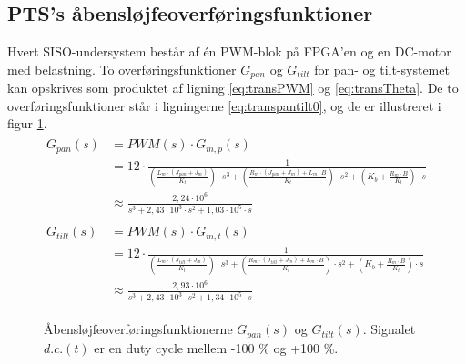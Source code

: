 \subsection{PTS's åbensløjfeoverføringsfunktioner}
Hvert SISO-undersystem består af én PWM-blok på FPGA'en og en DC-motor med belastning.
To overføringsfunktioner \(G_{pan}\) og \(G_{tilt}\) for pan- og tilt-systemet kan opskrives
som produktet af ligning \ref{eq:transPWM} og \ref{eq:transTheta}. De to overføringsfunktioner
står i ligningerne \ref{eq:transpantilt0}, og de er illustreret i figur \ref{fig:openloop1}.
\begin{align}
\label{eq:transpantilt0}
\begin{split}
	G_{pan}\left(s\right)&=PWM\left(s\right)\cdot{}G_{m,p}\left(s\right)\\
	&=12\cdot{}\frac{1}
			{\left(\frac{L_m\cdot{}\left(J_{pan}+J_m\right)}{K_t}\right)\cdot{}s^3
			+\left(\frac{R_m\cdot{}\left(J_{pan}+J_m\right)+L_m\cdot{}B}{K_t}\right)\cdot{}s^2
			+\left(K_b+\frac{R_m\cdot{}B}{K_t}\right)\cdot{}s}\\
	&\approx\frac{2,24\cdot{}10^6}{s^3 + 2,43\cdot{}10^3 \cdot{} s^2 + 1,03\cdot{}10^5\cdot{}s}
	\\
	\\
	G_{tilt}\left(s\right)&=PWM\left(s\right)\cdot{}G_{m,t}\left(s\right)\\
	&=12\cdot{}\frac{1}
			{\left(\frac{L_m\cdot{}\left(J_{tilt}+J_m\right)}{K_t}\right)\cdot{}s^3
			+\left(\frac{R_m\cdot{}\left(J_{tilt}+J_m\right)+L_m\cdot{}B}{K_t}\right)\cdot{}s^2
			+\left(K_b+\frac{R_m\cdot{}B}{K_t}\right)\cdot{}s}\\
	&\approx\frac{2,93\cdot{}10^6}{s^3 + 2,43\cdot{}10^3 \cdot{} s^2 + 1,34\cdot{}10^5\cdot{}s}
\end{split}
\end{align}
\begin{figure}[!th]
\centering
\begin{tikzpicture}[auto, node distance=2.6cm,>=latex']

\end{tikzpicture}
\caption[Åbensløjfeoverføringsfunktioner]{Åbensløjfeoverføringsfunktionerne \(G_{pan}\left(s\right)\) og \(G_{tilt}\left(s\right)\).
	Signalet \(d.c.\left(t\right)\) er en duty cycle mellem -100 \% og +100 \%.}
\label{fig:openloop1}
\end{figure}

